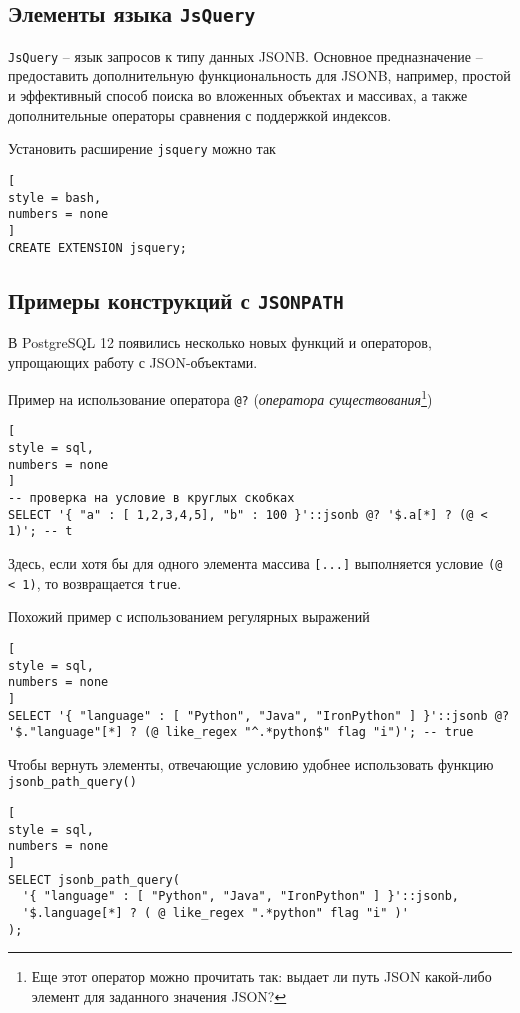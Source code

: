 \documentclass[%
	11pt,
	a4paper,
	utf8,
		]{article}
\begin{document}
\subsection{Элементы языка \texttt{JsQuery}}

\texttt{JsQuery} -- язык запросов к типу данных JSONB. Основное предназначение -- предоставить дополнительную функциональность для JSONB, например, простой и эффективный способ поиска во вложенных объектах и массивах, а также дополнительные операторы сравнения с поддержкой индексов.

Установить расширение \texttt{jsquery} можно так
\begin{lstlisting}[
style = bash,
numbers = none
]
CREATE EXTENSION jsquery;
\end{lstlisting}
 


\subsection{Примеры конструкций с \texttt{JSONPATH}}

В PostgreSQL 12 появились несколько новых функций и операторов, упрощающих работу с JSON-объектами.

Пример на использование оператора \verb|@?| (\emph{оператора существования}\footnote{Еще этот оператор можно прочитать так: выдает ли путь JSON какой-либо элемент для заданного значения JSON?})
\begin{lstlisting}[
style = sql, 
numbers = none
]
-- проверка на условие в круглых скобках
SELECT '{ "a" : [ 1,2,3,4,5], "b" : 100 }'::jsonb @? '$.a[*] ? (@ < 1)'; -- t
\end{lstlisting}

Здесь, если хотя бы для одного элемента массива \verb|[...]| выполняется условие \verb|(@ < 1)|, то возвращается \texttt{true}.

Похожий пример с использованием регулярных выражений
\begin{lstlisting}[
style = sql, 
numbers = none
]
SELECT '{ "language" : [ "Python", "Java", "IronPython" ] }'::jsonb @? '$."language"[*] ? (@ like_regex "^.*python$" flag "i")'; -- true
\end{lstlisting}

Чтобы вернуть элементы, отвечающие условию удобнее использовать функцию \verb|jsonb_path_query()|
\begin{lstlisting}[
style = sql, 
numbers = none
]
SELECT jsonb_path_query(
  '{ "language" : [ "Python", "Java", "IronPython" ] }'::jsonb,
  '$.language[*] ? ( @ like_regex ".*python" flag "i" )'
);
\end{lstlisting}
\end{document}
